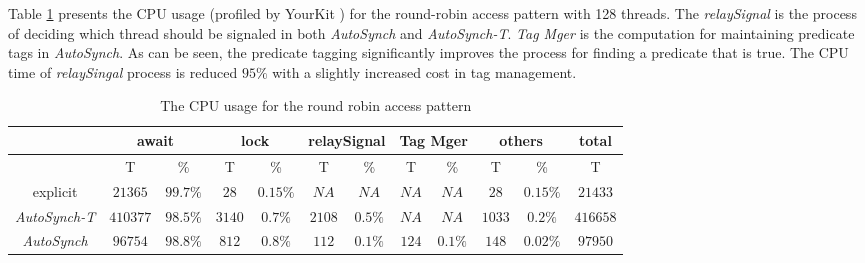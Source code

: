 \documentclass{sigplanconf}
\begin{document}
Table \ref{tab:cpu} presents the CPU usage (profiled by YourKit \cite{yourkit}) 
for the round-robin access pattern with 128 threads. The {\em relaySignal} is the
process of deciding which thread should be signaled in both {\em AutoSynch} and
{\em AutoSynch-T}. {\em Tag Mger} is the computation for
maintaining predicate tags in {\em AutoSynch}. 
As can be seen, the 
predicate tagging significantly improves the process for finding a predicate 
that is true. The CPU time of {\em relaySingal} process is reduced $95\%$ with
a slightly increased cost in tag management. 

\begin{table}[ht!]
   \centering
   \begin{tabular}{|c||c|c||c|c||c|c||c|c|c|c|c|}
      \hline 
      & \multicolumn{2}{c||}{await} & \multicolumn{2}{c||}{lock} & 
        \multicolumn{2}{c||}{relaySignal} & \multicolumn{2}{c|}{Tag Mger} &
        \multicolumn{2}{c|}{others} & total \\
      \hline
         & T & \% & T & \% & T & \% & T & \% & T & \% & T \\
      \hline 
      \hline 
      explicit & $21365$ & $99.7\%$ & $28$ & $0.15\%$ & $NA$ & $NA$ & $NA$ &
      $NA$  & $28$ & $0.15\%$ & $21433$ \\
      \hline 
      {\em AutoSynch-T} & $410377$ & $98.5\%$ & $3140$ & $0.7\%$ & $2108$ & $0.5\%$
      & $NA$ & $NA$ & $1033$ & $0.2\%$ & $416658$\\
      \hline 
      {\em AutoSynch} & $96754$ & $98.8\%$ & $812$ & $0.8\%$ & $112$ & $0.1\%$ & 
      $124$ & $0.1\%$ & $148$ & $0.02\%$ & $97950$\\
      \hline 
   \end{tabular}
   \caption{The CPU usage for the round robin access pattern}
   \label{tab:cpu}
\end{table}
\end{document}
